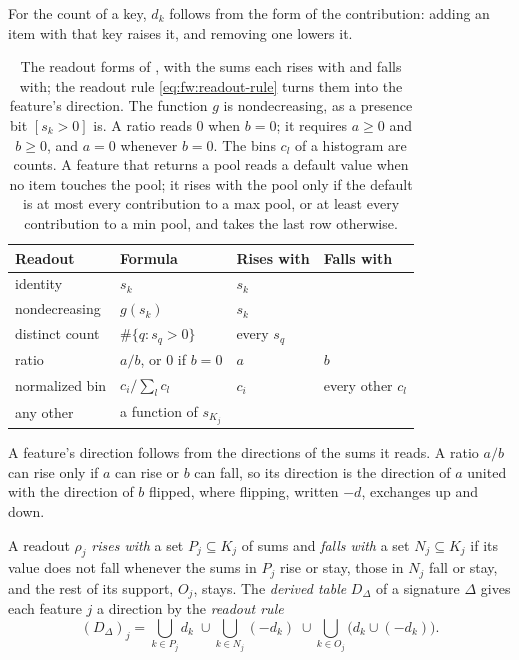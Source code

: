 For the count of a key, $d_k$ follows from the form of the contribution: adding an item with that key raises it, and
removing one lowers it.

\begin{table}[t]
  \caption{The readout forms of , with the sums each rises with and falls with; the readout rule
  \eqref{eq:fw:readout-rule} turns them into the feature's direction. The function $g$ is nondecreasing, as a presence bit $[s_k > 0]$ is.
  A ratio reads 0 when $b = 0$; it requires $a \ge 0$ and $b \ge 0$, and $a = 0$ whenever $b = 0$. The bins $c_l$ of
  a histogram are counts. A feature that returns a pool reads a default value when no item touches the pool; it rises with
the pool only if the default is at most every contribution to a max pool, or at least every contribution to a min
pool, and takes the last row otherwise.}
  \label{tab:fw:readouts}
  \small
  \begin{tabular}{@{}llll@{}}
    \toprule
    Readout & Formula & Rises with & Falls with \\
    \midrule
    identity & $s_k$ & $s_k$ & \\
    nondecreasing & $g(s_k)$ & $s_k$ & \\
    distinct count & $\#\{q : s_q > 0\}$ & every $s_q$ & \\
    ratio & $a / b$, or 0 if $b = 0$ & $a$ & $b$ \\
    normalized bin & $c_i / \sum_l c_l$ & $c_i$ & every other $c_l$ \\
    any other & a function of $s_{K_j}$ & & \\
    \bottomrule
  \end{tabular}
\end{table}

A feature's direction follows from the directions of the sums it reads. A ratio $a / b$ can rise only if $a$ can rise
or $b$ can fall, so its direction is the direction of $a$ united with the direction of $b$ flipped, where flipping,
written $-d$, exchanges up and down.

\label{def:fw:derived}
{
A readout $\rho_j$ \emph{rises with} a set $P_j \subseteq K_j$ of sums and \emph{falls with} a set $N_j \subseteq K_j$
if its value does not fall whenever the sums in $P_j$ rise or stay, those in $N_j$ fall or stay, and the rest of its
support, $O_j$, stays. The \emph{derived table} $D_\Delta$ of a signature $\Delta$ gives each feature $j$ a direction
by the \emph{readout rule}
\begin{equation}
  \label{eq:fw:readout-rule}
  (D_\Delta)_j = \bigcup_{k \in P_j} d_k \;\cup \bigcup_{k \in N_j} (-d_k) \;\cup \bigcup_{k \in O_j} \big(d_k \cup (-d_k)\big).
\end{equation}
}


